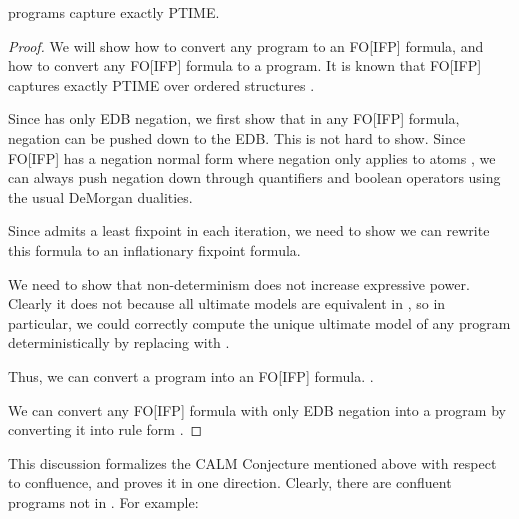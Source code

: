 \begin{theorem}
\slang programs capture exactly PTIME.
\end{theorem}
\begin{proof}
We will show how to convert any \slang program to an FO[IFP] formula, and how to convert any FO[IFP] formula to a \slang program.  It is known that FO[IFP] captures exactly PTIME over ordered structures .

Since \slang has only EDB negation, we first show that in any FO[IFP] formula, negation can be pushed down to the EDB.  This is not hard to show.  Since FO[IFP] has a negation normal form where negation only applies to atoms , we can always push negation down through quantifiers and boolean operators using the usual DeMorgan dualities.  

Since \slang admits a least fixpoint in each iteration, we need to show we can rewrite this formula to an inflationary fixpoint formula.  

We need to show that non-determinism does not increase expressive power.  Clearly it does not because all ultimate models are equivalent in \slang, so in particular, we could correctly compute the unique ultimate model of any \slang program deterministically by replacing  with .

Thus, we can convert a \slang program into an FO[IFP] formula. .

We can convert any FO[IFP] formula with only EDB negation into a \slang program by converting it into rule form .
\end{proof}



This discussion formalizes the CALM Conjecture mentioned above with respect to confluence, and proves it in one direction.
Clearly, there are confluent programs not in \slang.  For example:

